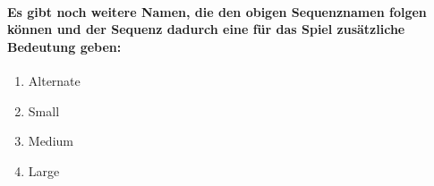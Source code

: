 \paragraph { Es gibt noch weitere Namen, die den obigen Sequenznamen folgen können und der Sequenz dadurch eine für das Spiel zusätzliche Bedeutung geben: }
\begin{enumerate}
\item Alternate
\item Small
\item Medium
\item Large
\end{enumerate}